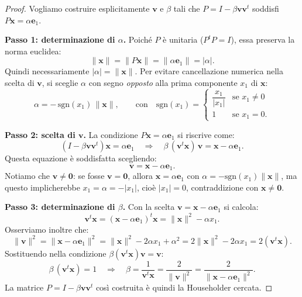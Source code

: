 \begin{proof}
    Vogliamo costruire esplicitamente $\mathbf{v}$ e $\beta$ tali che $P = I - \beta \mathbf{v}\mathbf{v}^t$ 
    soddisfi $P\mathbf{x} = \alpha \mathbf{e}_1$.

    \textbf{Passo 1: determinazione di $\alpha$.}
    Poiché $P$ è unitaria ($P^t P = I$), essa preserva la norma euclidea:
    \[
        \|\mathbf{x}\| = \|P\mathbf{x}\| = \|\alpha \mathbf{e}_1\| = |\alpha|.
    \]
    Quindi necessariamente $|\alpha| = \|\mathbf{x}\|$. Per evitare cancellazione numerica nella scelta di $\mathbf{v}$,
    si sceglie $\alpha$ con segno \textit{opposto} alla prima componente $x_1$ di $\mathbf{x}$:
    \[
        \alpha = -\,\mathrm{sgn}(x_1)\,\|\mathbf{x}\|, \qquad
        \text{con} \quad \mathrm{sgn}(x_1) = \begin{cases} \dfrac{x_1}{|x_1|} & \text{se } x_1 \neq 0 \\ 1 & \text{se } x_1 = 0. \end{cases}
    \]

    \textbf{Passo 2: scelta di $\mathbf{v}$.}
    La condizione $P\mathbf{x} = \alpha \mathbf{e}_1$ si riscrive come:
    \[
        (I - \beta \mathbf{v}\mathbf{v}^t)\mathbf{x} = \alpha \mathbf{e}_1
        \quad\Longrightarrow\quad
        \beta\,(\mathbf{v}^t \mathbf{x})\,\mathbf{v} = \mathbf{x} - \alpha \mathbf{e}_1.
    \]
    Questa equazione è soddisfatta scegliendo:
    \[
        \mathbf{v} = \mathbf{x} - \alpha \mathbf{e}_1.
    \]
    Notiamo che $\mathbf{v} \neq \mathbf{0}$: se fosse $\mathbf{v} = \mathbf{0}$, allora $\mathbf{x} = \alpha \mathbf{e}_1$
    con $\alpha = -\mathrm{sgn}(x_1)\|\mathbf{x}\|$, ma questo implicherebbe $x_1 = \alpha = -|x_1|$, cioè $|x_1| = 0$,
    contraddizione con $\mathbf{x} \neq \mathbf{0}$.

    \textbf{Passo 3: determinazione di $\beta$.}
    Con la scelta $\mathbf{v} = \mathbf{x} - \alpha \mathbf{e}_1$ si calcola:
    \[
        \mathbf{v}^t \mathbf{x} = (\mathbf{x} - \alpha \mathbf{e}_1)^t \mathbf{x}
        = \|\mathbf{x}\|^2 - \alpha x_1.
    \]
    Osserviamo inoltre che:
    \[
        \|\mathbf{v}\|^2 = \|\mathbf{x} - \alpha \mathbf{e}_1\|^2 = \|\mathbf{x}\|^2 - 2\alpha x_1 + \alpha^2
        = 2\|\mathbf{x}\|^2 - 2\alpha x_1 = 2(\mathbf{v}^t \mathbf{x}).
    \]
    Sostituendo nella condizione $\beta(\mathbf{v}^t\mathbf{x})\mathbf{v} = \mathbf{v}$:
    \[
        \beta\,(\mathbf{v}^t \mathbf{x}) = 1
        \quad\Longrightarrow\quad
        \beta = \frac{1}{\mathbf{v}^t \mathbf{x}} = \frac{2}{\|\mathbf{v}\|^2} = \frac{2}{\|\mathbf{x} - \alpha \mathbf{e}_1\|^2}.
    \]
    La matrice $P = I - \beta \mathbf{v}\mathbf{v}^t$ così costruita è quindi la Householder cercata.
\end{proof}

